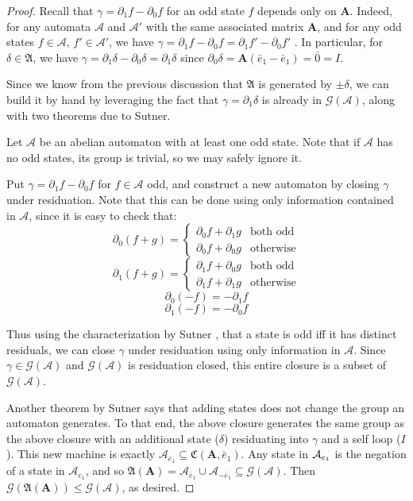 \documentclass[runningheads]{llncs}
\newcommand{\A}{\mathcal{A}}
\newcommand{\G}{\mathcal{G}}
\renewcommand{\P}{\mathfrak{A}}
\newcommand{\2}{\textbf{2}}
\newcommand{\Am}{\textbf{A}}
\newcommand{\del}{\partial}
\newcommand{\e}{\bar{e}}
\begin{document}
\begin{proof}
  Recall that $\gamma = \del_1 f - \del_0 f$ for an odd state $f$ depends 
  only on $\Am$. Indeed, for any automata $\A$ and $\A'$ with the same
  associated matrix $\Am$, and for any odd states $f \in \A$, $f' \in \A'$, 
  we have $\gamma = \del_1 f - \del_0 f = \del_1 f' - \del_0 f'$ \cite{Sutner18:abelian_automata}. 
  In particular, for $\delta \in \P$, we have 
  $\gamma = \del_1 \delta - \del_0 \delta = \del_1 \delta$ since
  $\del_0 \delta = \Am(\e_1 - \e_1) = \bar{0} = I$. 

  Since we know from the previous discussion that $\P$ is generated by
  $\pm \delta$, we can build it by hand by leveraging the fact that 
  $\gamma = \del_1 \delta$ is already in $\G(\A)$, along with two theorems
  due to Sutner.

  Let $\A$ be an abelian automaton with at least one odd state.
  Note that if $\A$ has no odd states, its group is trivial, so we may
  safely ignore it.

  Put $\gamma = \del_1 f - \del_0 f$ for $f \in \A$ odd, and construct
  a new automaton by closing $\gamma$ under residuation.
  Note that this can be done using only information contained in $\A$,
  since it is easy to check that:
  \[
    \del_0(f + g) = \begin{cases} \del_0 f + \del_1 g & \text{both odd}\\
                                  \del_0 f + \del_0 g & \text{otherwise}
                    \end{cases}
  \]
  \[
    \del_1(f + g) = \begin{cases} \del_1 f + \del_0 g & \text{both odd}\\
                                  \del_1 f + \del_1 g & \text{otherwise}
                    \end{cases}
  \]
  \[
    \del_0 (-f) = - \del_1 f
  \]
  \[
    \del_1 (-f) = - \del_0 f
  \]

  Thus using the characterization by Sutner \cite{Sutner18:abelian_automata}, 
  that a state is odd iff it has distinct residuals, we can close $\gamma$ 
  under residuation using only information in $\A$.
  Since $\gamma \in \G(\A)$ and $\G(\A)$ is residuation closed, 
  this entire closure is a subset of $\G(\A)$. 

  Another theorem by Sutner \cite{Sutner18:abelian_automata} says that adding
  states does not change the group an automaton generates. 
  To that end, the above closure generates the same group
  as the above closure with an additional state ($\delta$) residuating into 
  $\gamma$ and a self loop ($I$). This new machine is exactly
  $\A_{\e_1} \subseteq \mathfrak{C}(\Am,\e_1)$. Any state in $\A_{\-e_1}$ is
  the negation of a state in $\A_{e_1}$, and so 
  $\P(\Am) = \A_{\e_1} \cup \A_{-\e_1} \subseteq \G(\A)$. 
  Then $\G(\P(\Am)) \leq \G(\A)$, as desired.
\end{proof}
\end{document}
